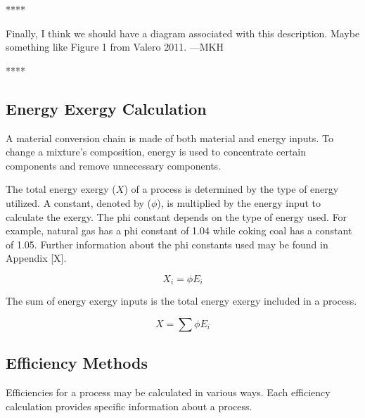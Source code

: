 \documentclass[energies,article,submit,pdftex,moreauthors]{Definitions/mdpi}
\begin{document}
****

Finally, I think we should have a diagram associated with this description.
Maybe something like Figure 1 from Valero 2011.
---MKH

****



\subsection{Energy Exergy Calculation}
\label{ssec: energy exergy calculation}

A material conversion chain
is made of both material and energy inputs.
To change a mixture's composition,
energy is used
to concentrate certain components
and remove unnecessary components.

The total energy exergy ($X$)
of a process
is determined by the type of energy utilized.
A constant, denoted by ($\phi$),
is multiplied by the energy input
to calculate the exergy.
The phi constant depends on the type of energy used.
For example, natural gas has a phi constant of 1.04
while coking coal has a constant of 1.05.
Further information about the phi constants used
may be found in Appendix [X].

\begin{equation}\label{eq:energy_exergy_definition}
  X_{i} = \phi E_{i}
\end{equation}

The sum of energy exergy inputs is the total energy exergy
included in a process.

\begin{equation}\label{eq:total_energy_exergy_definition}
  X = \sum{\phi E_{i}}
\end{equation}




\subsection{Efficiency Methods}
\label{ssec: efficiency_methods_and_calculations}

Efficiencies for a process may be calculated
in various ways.
Each efficiency calculation provides specific information
about a process.
\end{document}

